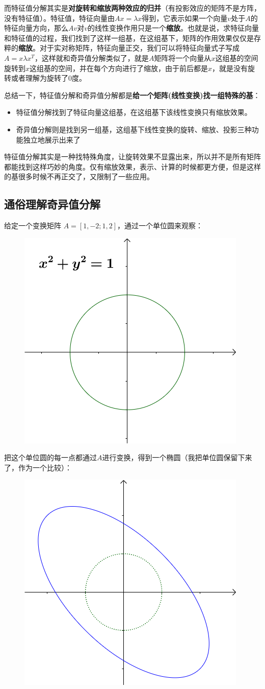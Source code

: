 \documentclass[12pt]{article}
\begin{document}
而特征值分解其实是\textbf{对旋转和缩放两种效应的归并}（有投影效应的矩阵不是方阵，没有特征值）。特征值，特征向量由$Ax=\lambda x$得到，它表示如果一个向量$v$处于$A$的特征向量方向，那么$Av$对$v$的线性变换作用只是一个\textbf{缩放}。也就是说，求特征向量和特征值的过程，我们找到了这样一组基，在这组基下，矩阵的作用效果仅仅是存粹的\textbf{缩放}。对于实对称矩阵，特征向量正交，我们可以将特征向量式子写成$A=x\lambda x^T$，这样就和奇异值分解类似了，就是$A$矩阵将一个向量从$x$这组基的空间旋转到$x$这组基的空间，并在每个方向进行了缩放，由于前后都是$x$，就是没有旋转或者理解为旋转了0度。

总结一下，特征值分解和奇异值分解都是\textbf{给一个矩阵(线性变换)找一组特殊的基}：
\begin{itemize}
    \item 特征值分解找到了特征向量这组基，在这组基下该线性变换只有缩放效果。
    
    \item 奇异值分解则是找到另一组基，这组基下线性变换的旋转、缩放、投影三种功能独立地展示出来了
\end{itemize}

特征值分解其实是一种找特殊角度，让旋转效果不显露出来，所以并不是所有矩阵都能找到这样巧妙的角度。仅有缩放效果，表示、计算的时候都更方便，但是这样的基很多时候不再正交了，又限制了一些应用。

\subsection{通俗理解奇异值分解}
给定一个变换矩阵 $A = [1, -2;1, 2]$，通过一个单位圆来观察：
\begin{figure}[H]
    \centering
    \includegraphics[width=.3\textwidth]{fig/UnderstandSingularValue_1.png}
\end{figure} 

把这个单位圆的每一点都通过$A$进行变换，得到一个椭圆（我把单位圆保留下来了，作为一个比较）：
\begin{figure}[H]
    \centering
    \includegraphics[width=.3\textwidth]{fig/UnderstandSingularValue_2.png}
\end{figure} 
\end{document}
